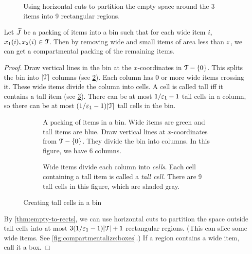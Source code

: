 \begin{figure}[htb]
\centering

\caption{Using horizontal cuts to partition the empty space
around the 3 items into 9 rectangular regions.}
\label{fig:thin-bp:empty-space-to-rects}
\end{figure}

\begin{lemma}
\label{thm:thin-bp:compartmentalize}
Let $\widetilde{J}$ be a packing of items into a bin such that for each wide item $i$,
$x_1(i), x_2(i) \in \mathcal{T}$. Then by removing wide and small items of area less than $\varepsilon$,
we can get a compartmental packing of the remaining items.
\end{lemma}
\begin{proof}
Draw vertical lines in the bin at the $x$-coordinates in $\mathcal{T} - \{0\}$.
This splits the bin into $|\mathcal{T}|$ columns (see \cref{fig:compartmentalize:begin}).
Each column has 0 or more wide items crossing it.
These wide items divide the column into cells.
A cell is called tall iff it contains a tall item (see \cref{fig:compartmentalize:tall-cells}).
There can be at most $1/\varepsilon_1-1$ tall cells in a column,
so there can be at most $(1/\varepsilon_1 - 1)|\mathcal{T}|$ tall cells in the bin.

\begin{figure}[!htb]
\begin{subfigure}{0.45\textwidth}
\centering

\caption{A packing of items in a bin. Wide items are green and tall items are blue.
Draw vertical lines at $x$-coordinates from $\mathcal{T} - \{0\}$.
They divide the bin into columns. In this figure, we have 6 columns.}
\label{fig:compartmentalize:begin}
\end{subfigure}
\hfill
\begin{subfigure}{0.45\textwidth}
\centering

\caption{Wide items divide each column into \emph{cells}.
Each cell containing a tall item is called a \emph{tall cell}.
There are 9 tall cells in this figure, which are shaded gray.}
\label{fig:compartmentalize:tall-cells}
\end{subfigure}
\caption{Creating tall cells in a bin}
\label{fig:compartmentalize-1}
\end{figure}

By \cref{thm:empty-to-rects}, we can use horizontal cuts to partition the space outside
tall cells into at most $3(1/\varepsilon_1-1)|\mathcal{T}| + 1$ rectangular regions.
(This can slice some wide items. See \cref{fig:compartmentalize:boxes}.)
If a region contains a wide item, call it a box.


\end{proof}
